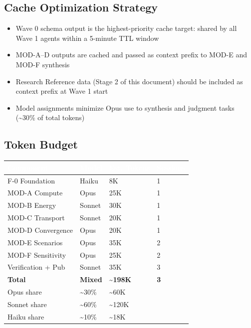\documentclass[11pt,letterpaper]{article}
\newcommand{\tableheader}[1]{\textbf{\sffamily\textcolor{white}{#1}}}
\begin{document}
\subsection{Cache Optimization Strategy}

\begin{itemize}[itemsep=2pt]
  \item Wave 0 schema output is the highest-priority cache target: shared by all Wave 1 agents within a 5-minute TTL window
  \item MOD-A--D outputs are cached and passed as context prefix to MOD-E and MOD-F synthesis
  \item Research Reference data (Stage 2 of this document) should be included as context prefix at Wave 1 start
  \item Model assignments minimize Opus use to synthesis and judgment tasks (\textasciitilde{}30\% of total tokens)
\end{itemize}

\subsection{Token Budget}

\begin{center}
\begin{tabularx}{\textwidth}{L{4cm}C{2cm}C{2cm}C{2cm}}
\toprule
{}
\tableheader{Component} & \tableheader{Model} & \tableheader{Est. Tokens} & \tableheader{Sessions} \\
\midrule
F-0 Foundation & Haiku & 8K & 1 \\
MOD-A Compute & Opus & 25K & 1 \\
MOD-B Energy & Sonnet & 30K & 1 \\
MOD-C Transport & Sonnet & 20K & 1 \\
MOD-D Convergence & Opus & 20K & 1 \\
MOD-E Scenarios & Opus & 35K & 2 \\
MOD-F Sensitivity & Opus & 25K & 2 \\
Verification + Pub & Sonnet & 35K & 3 \\
\midrule
\textbf{Total} & \textbf{Mixed} & \textbf{\textasciitilde{}198K} & \textbf{3} \\
Opus share & \textasciitilde{}30\% & \textasciitilde{}60K & \\
Sonnet share & \textasciitilde{}60\% & \textasciitilde{}120K & \\
Haiku share & \textasciitilde{}10\% & \textasciitilde{}18K & \\
\bottomrule
\end{tabularx}
\end{center}
\end{document}
